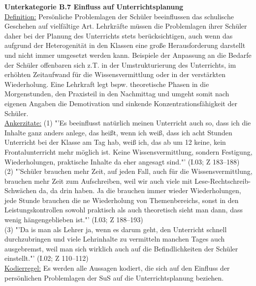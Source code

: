 \textbf{Unterkategorie B.7 Einfluss auf Unterrichtsplanung}\\
\underline{Definition:} Persönliche Problemlagen der Schüler beeinflussen das schulische Geschehen auf vielfältige Art. Lehrkräfte müssen die Problemlagen ihrer Schüler daher bei der Planung des Unterrichts stets berücksichtigen, auch wenn das aufgrund der Heterogenität in den Klassen eine große Herausforderung darstellt und nicht immer umgesetzt werden kann. Beispiele der Anpassung an die Bedarfe der Schüler offenbaren sich z.T. in der Umstrukturierung des Unterrichts, im erhöhten Zeitaufwand für die Wissensvermittlung oder in der verstärkten Wiederholung. Eine Lehrkraft legt bspw. theoretische Phasen in die Morgenstunden, den Praxisteil in den Nachmittag und umgeht somit nach eigenen Angaben die Demotivation und sinkende Konzentrationsfähigkeit der Schüler.\\
\underline{Ankerzitate:} (1) "'Es beeinflusst natürlich meinen Unterricht auch so, dass ich die Inhalte ganz anders anlege, das heißt, wenn ich weiß, dass ich acht Stunden Unterricht bei der Klasse am Tag hab, weiß ich, das ab um 12 keine, kein Frontalunterricht mehr möglich ist. Keine Wissensvermittlung, sondern Festigung, Wiederholungen, praktische Inhalte da eher angesagt sind."' (I.03; Z 183--188)\\ (2) "'Schüler brauchen mehr Zeit, auf jeden Fall, auch für die Wissensvermittlung, brauchen mehr Zeit zum Aufschreiben, weil wir auch viele mit Lese-Rechtschreib-Schwächen da, da drin haben. Ja die brauchen immer wieder Wiederholungen, jede Stunde brauchen die ne Wiederholung von Themenbereichs, sonst in den Leistungskontrollen sowohl praktisch als auch theoretisch sieht man dann, dass wenig hängengeblieben ist."' (I.03; Z 188--193)\\ (3) "'Da is man als Lehrer ja, wenn es darum geht, den Unterricht schnell durchzubringen und viele Lehrinhalte zu vermitteln manchen Tages auch ausgebremst, weil man sich wirklich auch auf die Befindlichkeiten der Schüler einstellt."' (I.02; Z 110--112)\\
\underline{Kodierregel:} Es werden alle Aussagen kodiert, die sich auf den Einfluss der persönlichen Problemlagen der SuS auf die Unterrichtsplanung beziehen.\\

